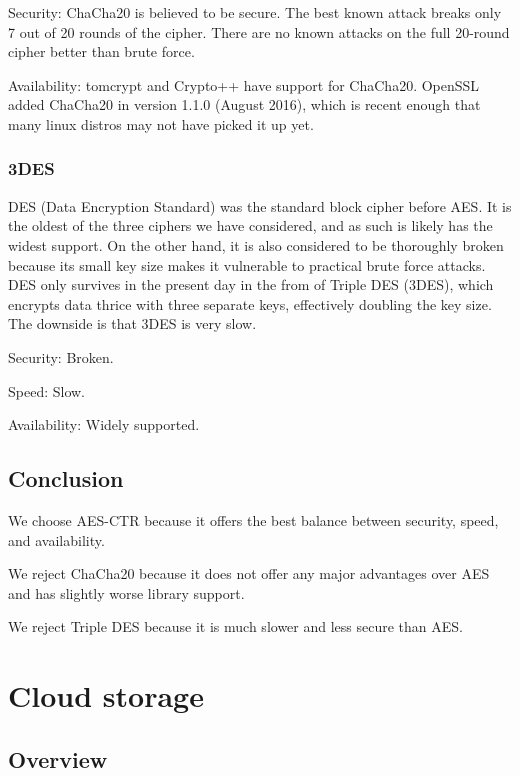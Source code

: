 Security: ChaCha20 is believed to be secure. The best known attack breaks only 7 out of 20 rounds of the cipher. There are no known attacks on the full 20-round cipher better than brute force.

Availability: tomcrypt and Crypto++ have support for ChaCha20. OpenSSL added ChaCha20 in version 1.1.0 (August 2016), which is recent enough that many linux distros may not have picked it up yet.

\subsubsection{ 3DES }

DES (Data Encryption Standard) was the standard block cipher before AES. It is the oldest of the three ciphers we have considered, and as such is likely has the widest support. On the other hand, it is also considered to be thoroughly broken because its small key size makes it vulnerable to practical brute force attacks. DES only survives in the present day in the from of Triple DES (3DES), which encrypts data thrice with three separate keys, effectively doubling the key size. The downside is that 3DES is very slow.

Security: Broken.

Speed: Slow.

Availability: Widely supported.

\subsection{ Conclusion }

We choose AES-CTR because it offers the best balance between security, speed, and availability.

We reject ChaCha20 because it does not offer any major advantages over AES and has slightly worse library support.

We reject Triple DES because it is much slower and less secure than AES.

\section{ Cloud storage }

\subsection{ Overview }

